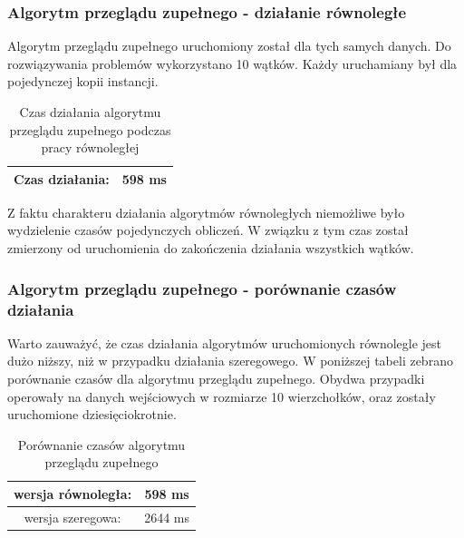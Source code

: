 \documentclass{article}
\begin{document}
		\subsubsection{Algorytm przeglądu zupełnego - działanie równoległe}			
			Algorytm przeglądu zupełnego uruchomiony został dla tych samych danych. Do rozwiązywania problemów wykorzystano 10 wątków. Każdy uruchamiany był dla pojedynczej kopii instancji. \\
			
				\begin{table}[H]
					\centering
					\caption{Czas działania algorytmu przeglądu zupełnego podczas pracy równoległej}
					\begin{tabular}{|c|c|}
						
						\hline Czas działania:   & 598 ms\\ 
					
						\hline 
					\end{tabular} 
				\end{table}
		Z faktu charakteru działania algorytmów równoległych niemożliwe było wydzielenie czasów pojedynczych obliczeń. W związku z tym czas został zmierzony od uruchomienia do zakończenia działania wszystkich wątków.
		\subsubsection{Algorytm przeglądu zupełnego - porównanie czasów działania}	
			Warto zauważyć, że czas działania algorytmów uruchomionych równolegle jest dużo niższy, niż w przypadku działania szeregowego. W poniższej tabeli zebrano porównanie czasów dla algorytmu przeglądu zupełnego. Obydwa przypadki operowały na danych wejściowych w rozmiarze 10 wierzchołków, oraz zostały uruchomione dziesięciokrotnie.
			
				\begin{table}[H]
					\centering
					\caption{Porównanie czasów algorytmu przeglądu zupełnego}
					\begin{tabular}{|c|c|}
					\hline wersja równoległa:  & 598 ms\\ 	
					\hline wersja szeregowa:  & 2644 ms\\ 
					\hline 
					\end{tabular} 
				\end{table}	
				
\end{document}
